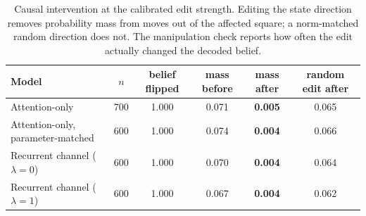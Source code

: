 \begin{table}[t]
\centering\small
\caption{Causal intervention at the calibrated edit strength. Editing the
state direction removes probability mass from moves out of the affected
square; a norm-matched random direction does not. The manipulation check
reports how often the edit actually changed the decoded belief.}
\label{tab:patch}
\begin{tabular}{lccccc}
\toprule
Model & $n$ & belief flipped & mass before & mass after & random edit after \\
\midrule
Attention-only & 700 & 1.000 & 0.071 & \textbf{0.005} & 0.065 \\
Attention-only, parameter-matched & 600 & 1.000 & 0.074 & \textbf{0.004} & 0.066 \\
Recurrent channel ($\lambda{=}0$) & 600 & 1.000 & 0.070 & \textbf{0.004} & 0.064 \\
Recurrent channel ($\lambda{=}1$) & 600 & 1.000 & 0.067 & \textbf{0.004} & 0.062 \\
\bottomrule
\end{tabular}
\end{table}

